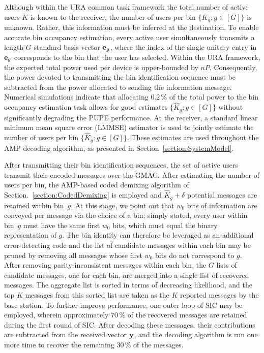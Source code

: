 \documentclass[journal]{IEEEtran}
\begin{document}
Although within the URA common task framework the total number of active users $K$ is known to the receiver, the number of users per bin $\{K_g : g \in [G]\}$ is unknown.
Rather, this information must be inferred at the destination. 
To enable accurate bin occupancy estimation, every active user simultaneously transmits a length-$G$ standard basis vector $\mathbf{e}_g$, where the index of the single unitary entry in $\mathbf{e}_g$ corresponds to the bin that the user has selected.
Within the URA framework, the expected total power used per device is upper-bounded by $nP$.
Consequently, the power devoted to transmitting the bin identification sequence must be subtracted from the power allocated to sending the information message.
Numerical simulations indicate that allocating $0.2\,\%$ of the total power to the bin occupancy estimation task allows for good estimates $\{\hat{K}_g : g \in [G]\}$ without significantly degrading the PUPE performance. 
At the receiver, a standard linear minimum mean square error (LMMSE) estimator is used to jointly estimate the number of users per bin $\{\hat{K}_g : g \in [G]\}$. 
These estimates are used throughout the AMP decoding algorithm, as presented in Section~\ref{section:SystemModel}. 

After transmitting their bin identification sequences, the set of active users transmit their encoded messages over the GMAC. 
After estimating the number of users per bin, the AMP-based coded demixing algorithm of Section.~\ref{section:CodedDemixing} is employed and $\hat{K}_g + \delta$ potential messages are retained within bin~$g$.
At this stage, we point out that $w_0$ bits of information are conveyed per message via the choice of a bin; simply stated, every user within bin~$g$ must have the same first $w_0$ bits, which must equal the binary representation of $g$.
The bin identity can therefore be leveraged as an additional error-detecting code and the list of candidate messages within each bin may be pruned by removing all messages whose first $w_0$ bits do not correspond to $g$.
After removing parity-inconsistent messages within each bin, the $G$ lists of candidate messages, one for each bin, are merged into a single list of recovered messages.
The aggregate list is sorted in terms of decreasing likelihood, and the top $K$ messages from this sorted list are taken as the $K$ reported messages by the base station.
To further improve performance, one outer loop of SIC may be employed, wherein approximately $70\,\%$ of the recovered messages are retained during the first round of SIC.  
After decoding these messages, their contributions are subtracted from the received vector $\mathbf{y}$, and the decoding algorithm is run one more time to recover the remaining $30\,\%$ of the messages. 
\end{document}

